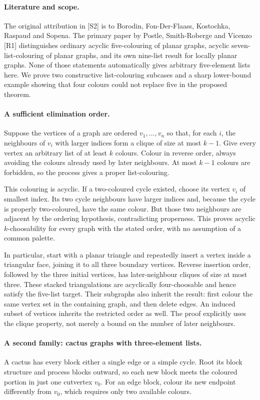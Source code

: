 \documentclass[11pt,a4paper]{article}
\begin{document}
\paragraph{Literature and scope.}
The original attribution in [S2] is to Borodin, Fon-Der-Flaass,
Kostochka, Raspaud and Sopena. The primary paper by Postle,
Smith-Roberge and Vicenzo [R1] distinguishes ordinary acyclic
five-colouring of planar graphs, acyclic seven-list-colouring of
planar graphs, and its own nine-list result for locally planar graphs.
None of those statements automatically gives arbitrary five-element
lists here. We prove two constructive list-colouring subcases and a
sharp lower-bound example showing that four colours could not replace
five in the proposed theorem.

\paragraph{A sufficient elimination order.}
Suppose the vertices of a graph are ordered $v_1,\ldots,v_n$ so that,
for each $i$, the neighbours of $v_i$ with larger indices form a clique
of size at most $k-1$. Give every vertex an arbitrary list of at least
$k$ colours. Colour in reverse order, always avoiding the colours
already used by later neighbours. At most $k-1$ colours are forbidden,
so the process gives a proper list-colouring.

This colouring is acyclic. If a two-coloured cycle existed, choose its
vertex $v_i$ of smallest index. Its two cycle neighbours have larger
indices and, because the cycle is properly two-coloured, have the same
colour. But those two neighbours are adjacent by the ordering hypothesis,
contradicting properness. This proves acyclic $k$-choosability for
every graph with the stated order, with no assumption of a common palette.

In particular, start with a planar triangle and repeatedly insert a
vertex inside a triangular face, joining it to all three boundary
vertices. Reverse insertion order, followed by the three initial
vertices, has later-neighbour cliques of size at most three. These
stacked triangulations are acyclically four-choosable and hence satisfy
the five-list target. Their subgraphs also inherit the result: first
colour the same vertex set in the containing graph, and then delete
edges. An induced subset of vertices inherits the restricted order as
well. The proof explicitly uses the clique property, not merely a
bound on the number of later neighbours.

\paragraph{A second family: cactus graphs with three-element lists.}
A cactus has every block either a single edge or a simple cycle.
Root its block structure and process blocks outward, so each new block
meets the coloured portion in just one cutvertex $v_0$. For an edge
block, colour its new endpoint differently from $v_0$, which requires
only two available colours.
\end{document}
